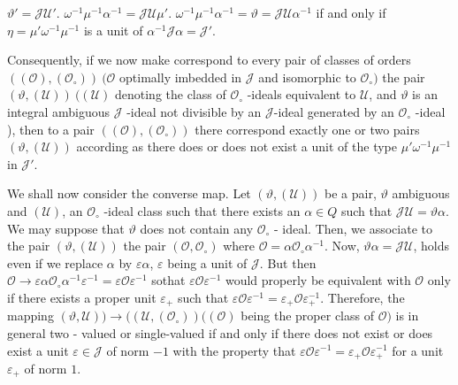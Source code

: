  $ \vartheta' = \mathcal{J} \mathscr{U}' $. $ \omega^{-1} \mu^{-1}
 \alpha^{-1} = \mathcal{J} \mathscr{U} \mu'$. $ \omega^{-1} \mu^{-1}
 \alpha^{-1} = \vartheta = \mathcal{J} \mathscr{U} \alpha^{-1} $ if
 and only if $ \eta = \mu' \omega^{-1} \mu^{-1} $ is a unit of $
 \alpha^{-1} \mathcal{J} \alpha = \mathcal{J}' $.  
 
 Consequently, if we now make correspond  to every pair of classes of
 orders $(( \mathscr{O} ), ( \mathscr{O}_\circ )) ~ ( \mathscr{O} $
 optimally imbedded in $ \mathcal{J} $ and isomorphic to  $
 \mathscr{O}_\circ ) $ the pair $ ( \vartheta, ( \mathscr{U} )) ~( (
 \mathscr{U} ) $  denoting the class of $  \mathscr{O}_\circ $ -ideals
 equivalent to $ \mathscr{U} $, and $ \vartheta $ is  an integral
 ambiguous  $ \mathcal{J} $ -ideal not divisible by an $ \mathcal{J}
 $-ideal generated by an $ \mathscr{O}_\circ $ -ideal ), then to a
 pair $ (( \mathscr{O}), ( \mathscr{O}_\circ )) $ there correspond
 exactly one or two pairs $ ( \vartheta, ( \mathscr{U} )) $  according
 as there does or does not exist a unit of the type $ \mu' \omega^{-1}
 \mu^{-1} $ in $ \mathcal{J}' $.  
 
 We shall now consider the converse map. Let $ ( \vartheta, (
 \mathscr{U} )) $ be a pair, $ \vartheta $ ambiguous and $ (
 \mathscr{U} )$, an $ \mathscr{O}_\circ $ -ideal class such that there
 exists an $ \alpha \in Q $ such that $ \mathcal{J} \mathscr{U} =
 \vartheta \alpha $. We may suppose that $ \vartheta $ does not
 contain any $ \mathscr{O}_\circ $ - ideal. Then, we associate to the
 pair $ ( \vartheta, ( \mathscr{U} )) $ the pair  $ ( \mathscr{O},
 \mathscr{O}_\circ ) $ where $ \mathscr{O} = \alpha \mathscr{O}_\circ
 \alpha^{-1} $. Now, $ \vartheta \alpha = \mathcal{J} \mathscr{U} $,
 holds even if we replace $ \alpha $ by $ \varepsilon \alpha $, $
 \varepsilon $ being a unit of $ \mathcal{J} $. But then $
 \mathscr{O} \rightarrow \varepsilon \alpha \mathscr{O}_\circ
 \alpha^{-1} \varepsilon^{-1} = \varepsilon \mathscr{O}
 \varepsilon^{-1} $ so\pageoriginale that $ \varepsilon \mathscr{O} \varepsilon^{-1}
 $ would properly be  equivalent with $ \mathscr{O} $ only if there
 exists a proper unit $ \varepsilon_+ $ such that $ \varepsilon
 \mathscr{O} \varepsilon^{-1} =  \varepsilon_+ \mathscr{O}
 \varepsilon_+^{-1} $. Therefore, the mapping $ (
 \vartheta,\mathscr{U} ) ) \rightarrow  (( \mathscr{U}, (
 \mathscr{O}_\circ ))  (( \mathscr{O} ) $ being the proper class of  $
 \mathscr{O} ) $ is in general two - valued or single-valued if and
 only if there does not exist or does exist a unit $ \varepsilon \in
 \mathcal{J} $ of norm $-1$ with the property that  $ \varepsilon
 \mathscr{O} \varepsilon^{-1} = \varepsilon_+ \mathscr{O}
 \varepsilon^{-1}_+ $  for a unit  $ \varepsilon_+ $ of norm $1$. 
 
